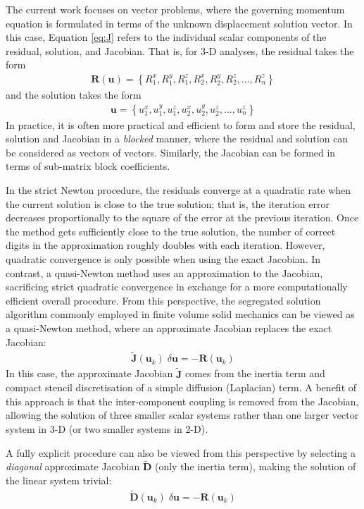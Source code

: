\documentclass[sn-mathphys,Numbered]{sn-jnl}%
\newcommand{\bb}{\boldsymbol}
\begin{document}
The current work focuses on vector problems, where the governing momentum equation is formulated in terms of the unknown displacement solution vector.
In this case, Equation \ref{eq:J} refers to the individual scalar components of the residual, solution, and Jacobian.
That is, for 3-D analyses, the residual takes the form
\begin{eqnarray}
	\bb{R}(\bb{u}) = \left\{ R_1^x, R_1^y, R_1^z, R_2^x, R_2^y, R_2^z, ..., R_n^z \right\}
\end{eqnarray}
and the solution takes the form
\begin{eqnarray}
	\bb{u} = \left\{ u_1^x, u_1^y, u_1^z, u_2^x, u_2^y, u_2^z, ..., u_n^z \right\}
\end{eqnarray}
In practice, it is often more practical and efficient to form and store the residual, solution and Jacobian in a \emph{blocked} manner, where the residual and solution can be considered as vectors of vectors.
Similarly, the Jacobian can be formed in terms of sub-matrix block coefficients.

In the strict Newton procedure, the residuals converge at a quadratic rate when the current solution is close to the true solution; that is, the iteration error decreases proportionally to the square of the error at the previous iteration.
Once the method gets sufficiently close to the true solution, the number of correct digits in the approximation roughly doubles with each iteration. 
However, quadratic convergence is only possible when using the exact Jacobian.
In contrast, a quasi-Newton method uses an approximation to the Jacobian, sacrificing strict quadratic convergence in exchange for a more computationally efficient overall procedure.
From this perspective, the segregated solution algorithm commonly employed in finite volume solid mechanics can be viewed as a quasi-Newton method, where an approximate Jacobian replaces the exact Jacobian: 
\begin{eqnarray} \label{eq:Seg}
    \bb{\tilde{J}}(\bb{u}_k) \;\delta \bb{u} = -\bb{R}(\bb{u}_k)
\end{eqnarray}
In this case, the approximate Jacobian $\bb{\tilde{J}}$ comes from the inertia term and compact stencil discretisation of a simple diffusion (Laplacian) term.
A benefit of this approach is that the inter-component coupling is removed from the Jacobian, allowing the solution of three smaller scalar systems rather than one larger vector system in 3-D (or two smaller systems in 2-D).

A fully explicit procedure can also be viewed from this perspective by selecting a \emph{diagonal} approximate Jacobian $\bb{\tilde{D}}$ (only the inertia term), making the solution of the linear system trivial:
\begin{eqnarray} \label{eq:exp}
    \bb{\tilde{D}}(\bb{u}_k) \;\delta \bb{u} = -\bb{R}(\bb{u}_k)
\end{eqnarray}
\end{document}
